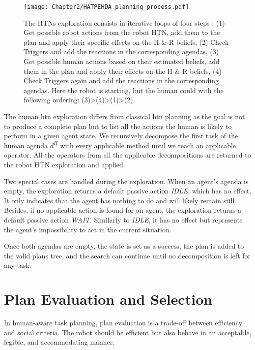 \begin{figure}
    \centering
    \texttt{[image: Chapter2/HATPEHDA\_planning\_process.pdf]}
    \caption{The HTNs exploration consists in iterative loops of four steps : (1) Get possible robot actions from the robot HTN, add them to the plan and apply their specific effects on the H \& R beliefs, (2) Check Triggers and add the reactions in the corresponding agendas, (3) Get possible human actions based on their estimated beliefs, add them in the plan and apply their effects on the H \& R  beliefs, (4) Check Triggers again and add the reactions in the corresponding agendas. Here the robot is starting, but the human could with the following ordering: (3)>(4)>(1)>(2).}
    \label{fig:HATPEHDA_planning_process}
\end{figure}

The human \acrshort{htn} exploration differs from classical \acrshort{htn} planning as the goal is not to produce a complete plan but to list all the actions the human is likely to perform in a given agent state. 
We recursively decompose the first task of the human agenda $d^H$ with every applicable method until we reach an applicable operator. All the operators from all the applicable decompositions are returned to the robot HTN exploration and applied.

Two special cases are handled during the exploration. 
When an agent's agenda is empty, the exploration returns a default passive action \textit{IDLE}, which has no effect. It only indicates that the agent has nothing to do and will likely remain still. 
Besides, if no applicable action is found for an agent, the exploration returns a default passive action \textit{WAIT}. Similarly to \textit{IDLE}, it has no effect but represents the agent's impossibility to act in the current situation. 

Once both agendas are empty, the state is set as a success, the plan is added to the valid plans tree, and the search can continue until no decomposition is left for any task.


\section{Plan Evaluation and Selection}

In human-aware task planning, plan evaluation is a trade-off between efficiency and social criteria.
The robot should be efficient but also behave in an acceptable, legible, and accommodating manner.  


